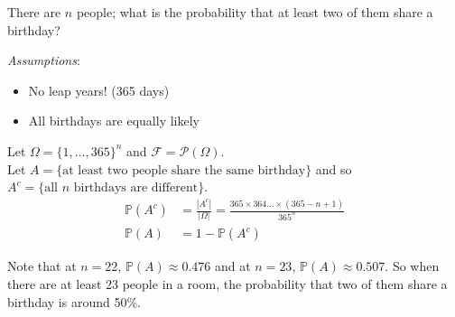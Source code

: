 \begin{example}
    There are $n$ people; what is the probability that at least two of them share a birthday?

    \emph{Assumptions}:
    \begin{itemize}
        \item No leap years! (365 days)
        \item All birthdays are equally likely
    \end{itemize}

    Let $\Omega = \{1, \dots, 365\}^n$ and $\mathcal F = \mathcal P(\Omega)$. \\
    Let $A = \{ \text{at least two people share the same birthday} \}$ and so \\
    $A^c = \{\text{all $n$ birthdays are different} \}$.
    \begin{align*}
        \mathbb{P}(A^c) &= \frac{|A^c|}{|\Omega|} = \frac{365 \times 364 \dots \times (365 - n + 1)}{365^n} \\
        \mathbb{P}(A) &= 1 - \mathbb{P}(A^c)
    \end{align*}

    Note that at $n=22$, $\mathbb{P}(A) \approx 0.476$ and at $n=23$, $\mathbb{P}(A) \approx 0.507$.
    So when there are at least 23 people in a room, the probability that two of them share a birthday is around 50\%.

\end{example}